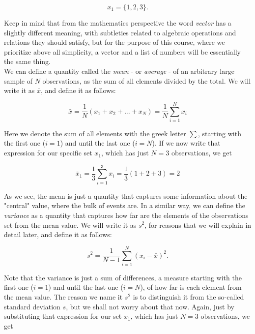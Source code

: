 \documentclass{book}
\begin{document}
\begin{equation}
x_{1} = \{1, 2, 3\} \nonumber. 
\end{equation}

Keep in mind that from the mathematics perspective the word \textit{vector} has a slightly different meaning, with subtleties related to algebraic operations and relations they should satisfy, but for the purpose of this course, where we prioritize above all simplicity, a vector and a list of numbers will be essentially the same thing.\\

We can define a quantity called the \textit{mean} - or \textit{average} - of an arbitrary large sample of $N$ observations, as the sum of all elements divided by the total. We will write it as $\bar{x}$, and define it as follows:

\begin{equation}
\bar{x} = \frac{1}{N} (x_{1} + x_{2} + ... + x_{N}) = \frac{1}{N} \sum_{i = 1}^{N} x_{i}
\end{equation}

Here we denote the sum of all elements with the greek letter $\sum$, starting with the first one ($i = 1$) and until the last one ($i = N$). If we now write that expression for our specific set $x_{1}$, which has just $N = 3$ observations, we get

\begin{equation}
\bar{x}_{1} = \frac{1}{3} \sum_{i = 1}^{3} x_{i} = \frac{1}{3} (1 + 2 + 3) = 2 \nonumber
\end{equation}

As we see, the mean is just a quantity that captures some information about the "central" value, where the bulk of events are. In a similar way, we can define the \textit{variance} as a quantity that captures how far are the elements of the observations set from the mean value. We will write it as $s^{2}$, for reasons that we will explain in detail later, and define it as follows:

\begin{equation}
s^{2} = \frac{1}{N - 1} \sum_{i = 1}^{N} (x_{i} - \bar{x})^{2}. 
\end{equation}

Note that the variance is just a sum of differences, a measure starting with the first one ($i = 1$) and until the last one ($i = N$), of how far is each element from the mean value. The reason we name it $s^{2}$ is to distinguish it from the so-called standard deviation $s$, but we shall not worry about that now. Again, just by substituting that expression for our set $x_{1}$, which has just $N = 3$ observations, we get
\end{document}
